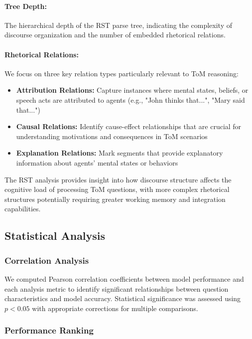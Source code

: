 \documentclass[12pt]{article}
\begin{document}
\paragraph{Tree Depth:} The hierarchical depth of the RST parse tree, indicating the complexity of discourse organization and the number of embedded rhetorical relations.

\paragraph{Rhetorical Relations:} We focus on three key relation types particularly relevant to ToM reasoning:

\begin{itemize}
    \item \textbf{Attribution Relations:} Capture instances where mental states, beliefs, or speech acts are attributed to agents (e.g., "John thinks that...", "Mary said that...")
    \item \textbf{Causal Relations:} Identify cause-effect relationships that are crucial for understanding motivations and consequences in ToM scenarios
    \item \textbf{Explanation Relations:} Mark segments that provide explanatory information about agents' mental states or behaviors
\end{itemize}

The RST analysis provides insight into how discourse structure affects the cognitive load of processing ToM questions, with more complex rhetorical structures potentially requiring greater working memory and integration capabilities.

\subsection{Statistical Analysis}

\subsubsection{Correlation Analysis}

We computed Pearson correlation coefficients between model performance and each analysis metric to identify significant relationships between question characteristics and model accuracy. Statistical significance was assessed using $p < 0.05$ with appropriate corrections for multiple comparisons.

\subsubsection{Performance Ranking}
\end{document}
